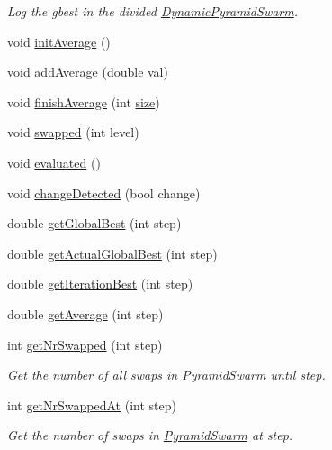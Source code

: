 \begin{CompactItemize}
\begin{CompactList}\small\item\em Log the gbest in the divided \hyperlink{classDynamicPyramidSwarm}{DynamicPyramidSwarm}. \item\end{CompactList}\item 
void \hyperlink{classPsoStatistics_f6a8ad5a404e02507a2e8bbaa1235c0f}{initAverage} ()
\item 
void \hyperlink{classPsoStatistics_6ff0044f38bab5187ac001bce0d73a5d}{addAverage} (double val)
\item 
void \hyperlink{classPsoStatistics_d3e52ecec8fefe72150dd6b53abe6c12}{finishAverage} (int \hyperlink{runpso_8cpp_439227feff9d7f55384e8780cfc2eb82}{size})
\item 
void \hyperlink{classPsoStatistics_c9c254251cc94ff10cd386024aa9596d}{swapped} (int level)
\item 
void \hyperlink{classPsoStatistics_b2d2a9dcc6d8768be003c8a32d99c308}{evaluated} ()
\item 
void \hyperlink{classPsoStatistics_84f90498fd9477122cf1dd5541a18691}{changeDetected} (bool change)
\item 
double \hyperlink{classPsoStatistics_73939838a30fc8acd1ae82f8565775a6}{getGlobalBest} (int step)
\item 
double \hyperlink{classPsoStatistics_da296b91e976a0d5789e7a79e4b1dccf}{getActualGlobalBest} (int step)
\item 
double \hyperlink{classPsoStatistics_dabe260a05e09982ab891075ac380450}{getIterationBest} (int step)
\item 
double \hyperlink{classPsoStatistics_643bb60f8bef5aa5015c8d562bd4785b}{getAverage} (int step)
\item 
int \hyperlink{classPsoStatistics_891f35f4f6e8a29f47b4e8537ba23e4b}{getNrSwapped} (int step)
\begin{CompactList}\small\item\em Get the number of all swaps in \hyperlink{classPyramidSwarm}{PyramidSwarm} until step. \item\end{CompactList}\item 
int \hyperlink{classPsoStatistics_fbff3218d9cf6a42ba38ac14d9c92fdd}{getNrSwappedAt} (int step)
\begin{CompactList}\small\item\em Get the number of swaps in \hyperlink{classPyramidSwarm}{PyramidSwarm} at step. \item\end{CompactList}\item 

\end{CompactItemize}
